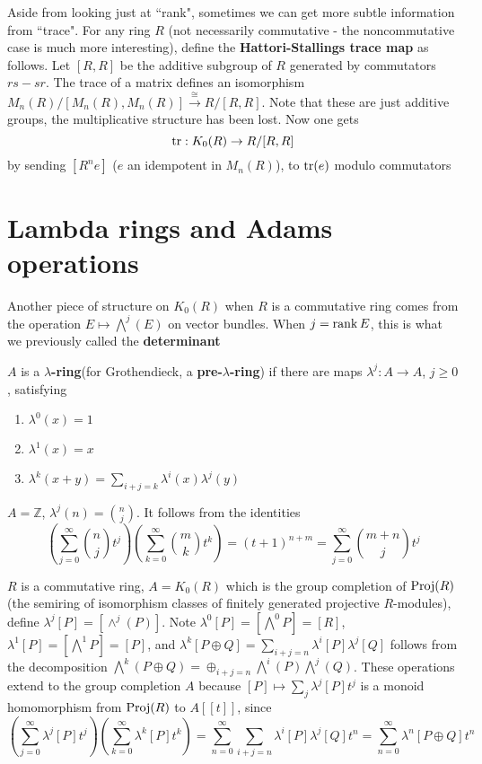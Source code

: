\documentclass[main]{subfiles}
\begin{document}
Aside from looking just at ``rank", sometimes we can get more subtle information from ``trace". For any ring $R$ (not necessarily commutative - the noncommutative case is much more interesting), define the \textbf{Hattori-Stallings trace map} as follows. Let $[R,R]$ be the additive subgroup of $R$ generated by commutators $rs-sr$. The trace of a matrix defines an isomorphism $M_n(R)/[M_n(R),M_n(R)]\xrightarrow{\cong} R/[R,R]$. Note that these are just additive groups, the multiplicative structure has been lost. Now one gets
\[
\operatorname{tr}:K_0(R)\to R/[R,R]
\]
by sending $[R^ne]$ ($e$ an idempotent in $M_n(R)$), to $\operatorname{tr}(e)$ modulo commutators

\begin{proposition}

\end{proposition}

\section{Lambda rings and Adams operations}

Another piece of structure on $K_0(R)$ when $R$ is a commutative ring comes from the operation $E\mapsto\bigwedge^j(E)$ on vector bundles. When $j=\operatorname{rank} E$, this is what we previously called the \textbf{determinant}

\begin{definition}
$A$ is a \textbf{$\lambda$-ring}(for Grothendieck, a \textbf{pre-$\lambda$-ring}) if there are maps $\lambda^j:A\to A$, $j\geq0$, satisfying
\begin{enumerate}
\item $\lambda^0(x)=1$
\item $\lambda^1(x)=x$
\item $\lambda^k(x+y)=\sum_{i+j=k}\lambda^i(x)\lambda^j(y)$
\end{enumerate}
\end{definition}

\begin{example}
$A=\mathbb Z$, $\lambda^j(n)=\binom{n}{j}$. It follows from the identities
\[
\left(\sum_{j=0}^\infty\binom{n}{j}t^j\right)\left(\sum_{k=0}^\infty\binom{m}{k}t^k\right)=(t+1)^{n+m}=\sum_{j=0}^\infty\binom{m+n}{j}t^j
\]
\end{example}

\begin{example}
$R$ is a commutative ring, $A=K_0(R)$ which is the group completion of $\operatorname{Proj}(R)$ (the semiring of isomorphism classes of finitely generated projective $R$-modules), define $\lambda^j[P]=[\wedge^j(P)]$. Note $\lambda^0[P]=[\bigwedge^0P]=[R]$, $\lambda^1[P]=[\bigwedge^1P]=[P]$, and $\lambda^k[P\oplus Q]=\sum_{i+j=n}\lambda^i[P]\lambda^j[Q]$ follows from the decomposition $\bigwedge^k(P\oplus Q)=\oplus_{i+j=n}\bigwedge^i(P)\bigwedge^j(Q)$. These operations extend to the group completion $A$ because $[P]\mapsto\sum_j\lambda^j[P]t^j$ is a monoid homomorphism from $\operatorname{Proj}(R)$ to $A[[t]]$, since
\[
\left(\sum_{j=0}^\infty\lambda^j[P]t^j\right)\left(\sum_{k=0}^\infty\lambda^k[P]t^k\right)=\sum_{n=0}^\infty\sum_{i+j=n}\lambda^i[P]\lambda^j[Q]t^n=\sum_{n=0}^\infty\lambda^{n}[P\oplus Q]t^n
\]
\end{example}
\end{document}
